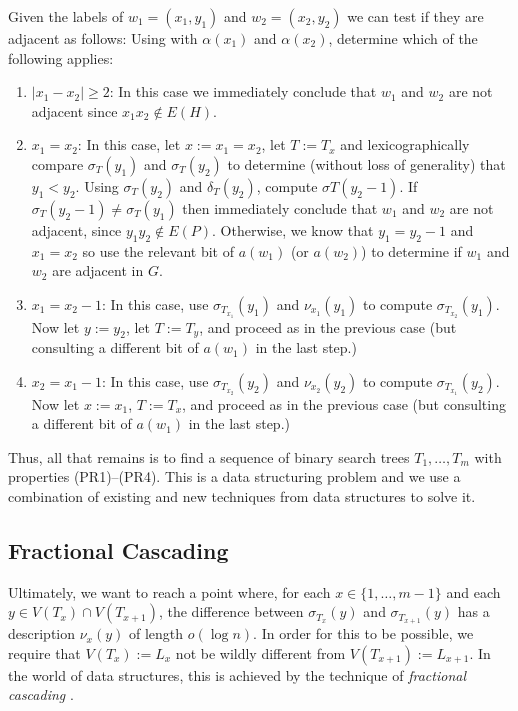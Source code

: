\documentclass[kpfonts]{patmorin}
\begin{document}
Given the labels of $w_1=(x_1,y_1)$ and $w_2=(x_2,y_2)$ we can test if they are adjacent as follows: Using  with $\alpha(x_1)$ and $\alpha(x_2)$, determine which of the following applies:
\begin{enumerate}
  \item $|x_1-x_2|\ge 2$: In this case we immediately conclude that $w_1$ and $w_2$ are not adjacent since $x_1x_2\not\in E(H)$.  
  
  \item $x_1=x_2$: In this case, let $x:=x_1=x_2$, let $T:=T_x$ and lexicographically compare $\sigma_T(y_1)$ and $\sigma_T(y_2)$ to determine (without loss of generality) that $y_1<y_2$.  Using $\sigma_{T}(y_2)$ and $\delta_{T}(y_2)$, compute $\sigma{T}(y_2-1)$.  If $\sigma_T(y_2-1)\neq \sigma_T(y_1)$ then immediately conclude that $w_1$ and $w_2$ are not adjacent, since $y_1y_2\not\in E(P)$.  Otherwise, we know that $y_1=y_2-1$ and $x_1=x_2$ so use the relevant bit of $a(w_1)$ (or $a(w_2)$) to determine if $w_1$ and $w_2$ are adjacent in $G$.
  
  \item $x_1=x_2-1$: In this case, use $\sigma_{T_{x_1}}(y_1)$ and $\nu_{x_1}(y_1)$ to compute $\sigma_{T_{x_2}}(y_1)$.  Now let $y:=y_2$, let $T:=T_{y}$, and proceed as in the previous case (but consulting a different bit of $a(w_1)$ in the last step.)
  
  \item $x_2=x_1-1$: In this case, use $\sigma_{T_{x_2}}(y_2)$ and $\nu_{x_2}(y_2)$ to compute $\sigma_{T_{x_1}}(y_2)$.  Now let $x:=x_1$, $T:=T_{x}$, and proceed as in the previous case (but consulting a different bit of $a(w_1)$ in the last step.)
\end{enumerate}

Thus, all that remains is to find a sequence of binary search trees $T_1,\ldots,T_m$ with properties (PR1)--(PR4). This is a data structuring problem and we use a combination of existing and new techniques from data structures to solve it.

\subsection{Fractional Cascading}

Ultimately, we want to reach a point where, for each $x\in\{1,\ldots,m-1\}$ and each $y\in V(T_x)\cap V(T_{x+1})$, the difference between $\sigma_{T_x}(y)$ and $\sigma_{T_{x+1}}(y)$ has a description $\nu_x(y)$ of length $o(\log n)$.  In order for this to be possible, we require that $V(T_x):= L_x$ not be wildly different from $V(T_{x+1}):= L_{x+1}$.  In the world of data structures, this is achieved by the technique of \emph{fractional cascading} \cite{chazelle.guibas:fractional1, chazelle.guibas:fractional2}.
\end{document}
